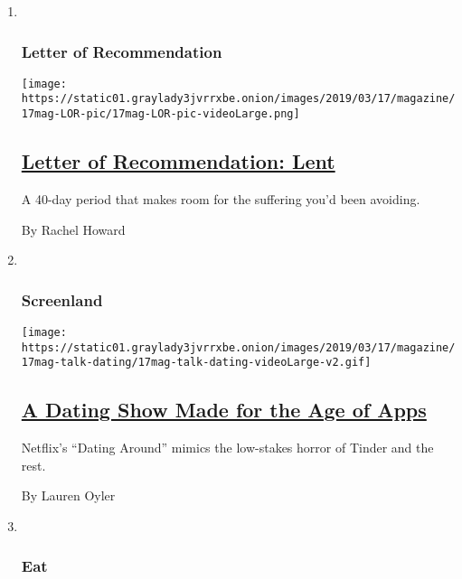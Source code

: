 \begin{enumerate}
\def\labelenumi{\arabic{enumi}.}
\item ~
  \hypertarget{letter-of-recommendation}{%
  \subsubsection{Letter of
  Recommendation}\label{letter-of-recommendation}}

  \texttt{[image: https://static01.graylady3jvrrxbe.onion/images/2019/03/17/magazine/17mag-LOR-pic/17mag-LOR-pic-videoLarge.png]}

  \hypertarget{letter-of-recommendation-lent}{%
  \subsection{\texorpdfstring{\href{/2019/03/12/magazine/letter-of-recommendation-lent.html}{Letter
  of Recommendation:
  Lent}}{Letter of Recommendation: Lent}}\label{letter-of-recommendation-lent}}

  A 40-day period that makes room for the suffering you'd been avoiding.

  By Rachel Howard
\item ~
  \hypertarget{screenland}{%
  \subsubsection{Screenland}\label{screenland}}

  \texttt{[image: https://static01.graylady3jvrrxbe.onion/images/2019/03/17/magazine/17mag-talk-dating/17mag-talk-dating-videoLarge-v2.gif]}

  \hypertarget{a-dating-show-made-for-the-age-of-apps}{%
  \subsection{\texorpdfstring{\href{/2019/03/14/magazine/a-dating-show-made-for-the-age-of-apps.html}{A
  Dating Show Made for the Age of
  Apps}}{A Dating Show Made for the Age of Apps}}\label{a-dating-show-made-for-the-age-of-apps}}

  Netflix's ``Dating Around'' mimics the low-stakes horror of Tinder and
  the rest.

  By Lauren Oyler
\item ~
  \hypertarget{eat}{%
  \subsubsection{Eat}\label{eat}}


\end{enumerate}
